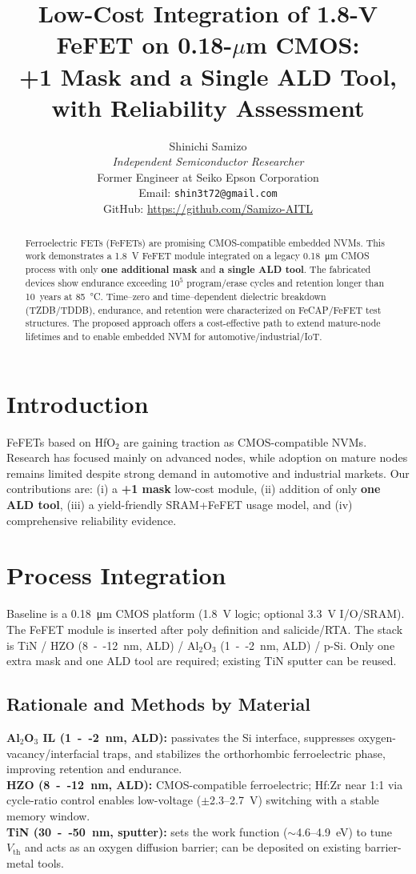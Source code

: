 \documentclass[conference]{IEEEtran}
\title{Low-Cost Integration of 1.8-V FeFET on 0.18-\(\mu\)m CMOS:\\
+1 Mask and a Single ALD Tool, with Reliability Assessment}
\author{%
Shinichi Samizo\\
\emph{Independent Semiconductor Researcher}\\
Former Engineer at Seiko Epson Corporation\\
Email: \texttt{shin3t72@gmail.com}\\
GitHub: \url{https://github.com/Samizo-AITL}
}
\begin{document}
\maketitle

\begin{abstract}
Ferroelectric FETs (FeFETs) are promising CMOS-compatible embedded NVMs. This work demonstrates a \SI{1.8}{V} FeFET module integrated on a legacy \SI{0.18}{\micro m} CMOS process with only \textbf{one additional mask} and \textbf{a single ALD tool}. The fabricated devices show endurance exceeding \(10^{5}\) program/erase cycles and retention longer than 10~years at \SI{85}{\celsius}. Time--zero and time--dependent dielectric breakdown (TZDB/TDDB), endurance, and retention were characterized on FeCAP/FeFET test structures. The proposed approach offers a cost-effective path to extend mature-node lifetimes and to enable embedded NVM for automotive/industrial/IoT.
\end{abstract}

\section{Introduction}
FeFETs based on HfO\(_2\) are gaining traction as CMOS-compatible NVMs. Research has focused mainly on advanced nodes, while adoption on mature nodes remains limited despite strong demand in automotive and industrial markets. Our contributions are: (i) a \textbf{+1 mask} low-cost module, (ii) addition of only \textbf{one ALD tool}, (iii) a yield-friendly SRAM+FeFET usage model, and (iv) comprehensive reliability evidence.

\section{Process Integration}
Baseline is a \SI{0.18}{\micro m} CMOS platform (\SI{1.8}{V} logic; optional \SI{3.3}{V} I/O/SRAM). The FeFET module is inserted after poly definition and salicide/RTA. The stack is TiN / HZO (\SI{8}{--}\SI{12}{nm}, ALD) / Al\(_2\)O\(_3\) (\SI{1}{--}\SI{2}{nm}, ALD) / p-Si. Only one extra mask and one ALD tool are required; existing TiN sputter can be reused.

\subsection{Rationale and Methods by Material}
\textbf{Al\(_2\)O\(_3\) IL (\SI{1}{--}\SI{2}{nm}, ALD):} passivates the Si interface, suppresses oxygen-vacancy/interfacial traps, and stabilizes the orthorhombic ferroelectric phase, improving retention and endurance.\\
\textbf{HZO (\SI{8}{--}\SI{12}{nm}, ALD):} CMOS-compatible ferroelectric; Hf:Zr near 1:1 via cycle-ratio control enables low-voltage (\(\pm\)2.3–\SI{2.7}{V}) switching with a stable memory window.\\
\textbf{TiN (\SI{30}{--}\SI{50}{nm}, sputter):} sets the work function (\(\sim\)4.6–4.9~eV) to tune \(V_{\mathrm{th}}\) and acts as an oxygen diffusion barrier; can be deposited on existing barrier-metal tools.
\end{document}
